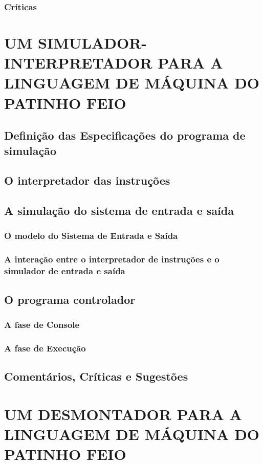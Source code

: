 \documentclass[a4paper,12pt]{article}
\begin{document}
\subsubsection{Críticas}

\section{UM SIMULADOR-INTERPRETADOR PARA A LINGUAGEM DE MÁQUINA DO PATINHO FEIO}
\subsection{Definição das Especificações do programa de simulação}

\subsection{O interpretador das instruções}

\subsection{A simulação do sistema de entrada e saída}
\subsubsection{O modelo do Sistema de Entrada e Saída}
\subsubsection{A interação entre o interpretador de instruções e o simulador de entrada e saída}

\subsection{O programa controlador}
\subsubsection{A fase de Console}
\subsubsection{A fase de Execução}

\subsection{Comentários, Críticas e Sugestões}

\section{UM DESMONTADOR PARA A LINGUAGEM DE MÁQUINA DO PATINHO FEIO}
\end{document}
